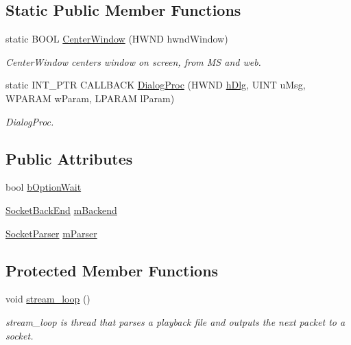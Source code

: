 \subsection*{Static Public Member Functions}
\begin{DoxyCompactItemize}
\item 
static B\+O\+O\+L \hyperlink{class_socket___replay___dlg_a82d1271e0908b3a8c52d7236d969429a}{Center\+Window} (H\+W\+N\+D hwnd\+Window)
\begin{DoxyCompactList}\small\item\em Center\+Window centers window on screen, from M\+S and web. \end{DoxyCompactList}\item 
static I\+N\+T\+\_\+\+P\+T\+R C\+A\+L\+L\+B\+A\+C\+K \hyperlink{class_socket___replay___dlg_ac989be1d141455b41d68992e7540fbb4}{Dialog\+Proc} (H\+W\+N\+D \hyperlink{class_socket___replay___dlg_a00afcf609f06368bbe64cf31546736d0}{h\+Dlg}, U\+I\+N\+T u\+Msg, W\+P\+A\+R\+A\+M w\+Param, L\+P\+A\+R\+A\+M l\+Param)
\begin{DoxyCompactList}\small\item\em Dialog\+Proc. \end{DoxyCompactList}\end{DoxyCompactItemize}
\subsection*{Public Attributes}
\begin{DoxyCompactItemize}
\item 
bool \hyperlink{class_socket___replay___dlg_a2f5d345ed86ec71d60e51b5583cda8b3}{b\+Option\+Wait}
\item 
\hyperlink{class_socket_back_end}{Socket\+Back\+End} \hyperlink{class_socket___replay___dlg_ad87d846ca29a78c8f1bda66c8dc1a48a}{m\+Backend}
\item 
\hyperlink{class_socket_parser}{Socket\+Parser} \hyperlink{class_socket___replay___dlg_a6d2cb27043d1247d1368b594c43759ea}{m\+Parser}
\end{DoxyCompactItemize}
\subsection*{Protected Member Functions}
\begin{DoxyCompactItemize}
\item 
\hypertarget{class_socket___replay___dlg_a21732c4312380f9078c9182f3a883cac}{}void \hyperlink{class_socket___replay___dlg_a21732c4312380f9078c9182f3a883cac}{stream\+\_\+loop} ()\label{class_socket___replay___dlg_a21732c4312380f9078c9182f3a883cac}

\begin{DoxyCompactList}\small\item\em stream\+\_\+loop is thread that parses a playback file and outputs the next packet to a socket. \end{DoxyCompactList}\end{DoxyCompactItemize}
